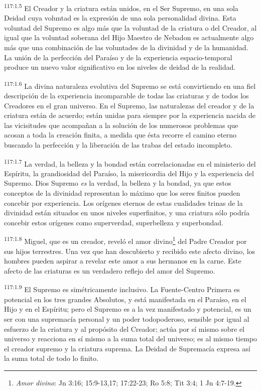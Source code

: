 \documentclass[twoside, 11pt]{book}
\begin{document}
\par
\textsuperscript{117:1.5} El Creador y la criatura están unidos, en el Ser Supremo, en una sola Deidad cuya voluntad es la expresión de una sola personalidad divina. Esta voluntad del Supremo es algo más que la voluntad de la criatura o del Creador, al igual que la voluntad soberana del Hijo Maestro de Nebadon es actualmente algo más que una combinación de las voluntades de la divinidad y de la humanidad. La unión de la perfección del Paraíso y de la experiencia espacio-temporal produce un nuevo valor significativo en los niveles de deidad de la realidad.

\par
\textsuperscript{117:1.6} La divina naturaleza evolutiva del Supremo se está convirtiendo en una fiel descripción de la experiencia incomparable de todas las criaturas y de todos los Creadores en el gran universo. En el Supremo, las naturalezas del creador y de la criatura están de acuerdo; están unidas para siempre por la experiencia nacida de las vicisitudes que acompañan a la solución de los numerosos problemas que acosan a toda la creación finita, a medida que ésta recorre el camino eterno buscando la perfección y la liberación de las trabas del estado incompleto.

\par
\textsuperscript{117:1.7} La verdad, la belleza y la bondad están correlacionadas en el ministerio del Espíritu, la grandiosidad del Paraíso, la misericordia del Hijo y la experiencia del Supremo. Dios Supremo \textit{es} la verdad, la belleza y la bondad, ya que estos conceptos de la divinidad representan lo máximo que los seres finitos pueden concebir por experiencia. Los orígenes eternos de estas cualidades trinas de la divinidad están situados en unos niveles superfinitos, y una criatura sólo podría concebir estos orígenes como superverdad, superbelleza y superbondad.

\par
\textsuperscript{117:1.8} Miguel, que es un creador, reveló el amor divino\footnote{\textit{Amor divino}: Jn 3:16; 15:9-13,17; 17:22-23; Ro 5:8; Tit 3:4; 1 Jn 4:7-19.} del Padre Creador por sus hijos terrestres. Una vez que han descubierto y recibido este afecto divino, los hombres pueden aspirar a revelar este amor a sus hermanos en la carne. Este afecto de las criaturas es un verdadero reflejo del amor del Supremo.

\par
\textsuperscript{117:1.9} El Supremo es simétricamente inclusivo. La Fuente-Centro Primera es potencial en los tres grandes Absolutos, y está manifestada en el Paraíso, en el Hijo y en el Espíritu; pero el Supremo es a la vez manifestado y potencial, es un ser con una supremacía personal y un poder todopoderoso, sensible por igual al esfuerzo de la criatura y al propósito del Creador; actúa por sí mismo sobre el universo y reacciona en sí mismo a la suma total del universo; es al mismo tiempo el creador supremo y la criatura suprema. La Deidad de Supremacía expresa así la suma total de todo lo finito.
\end{document}
